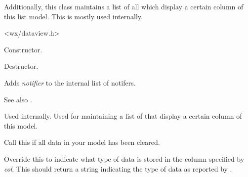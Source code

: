 Additionally, this class maintains a list of all 
 which
display a certain column of this list model. This is
mostly used internally.




<wx/dataview.h>


\label{wxdataviewlistmodelwxdataviewlistmodel}


Constructor.

\label{wxdataviewlistmodeldtor}


Destructor.

\label{wxdataviewlistmodeladdnotifier}


Adds {\it notifier} to the internal list of notifers.

See also .

\label{wxdataviewlistmodeladdviewingcolumn}


Used internally. Used for maintaining a list of
 that
display a certain column of this model.

\label{wxdataviewlistmodelcleared}


Call this if all data in your model has been cleared.

\label{wxdataviewlistmodelgetcoltype}


Override this to indicate what type of data is stored in the
column specified by {\it col}. This should return a string
indicating the type of data as reported by .

